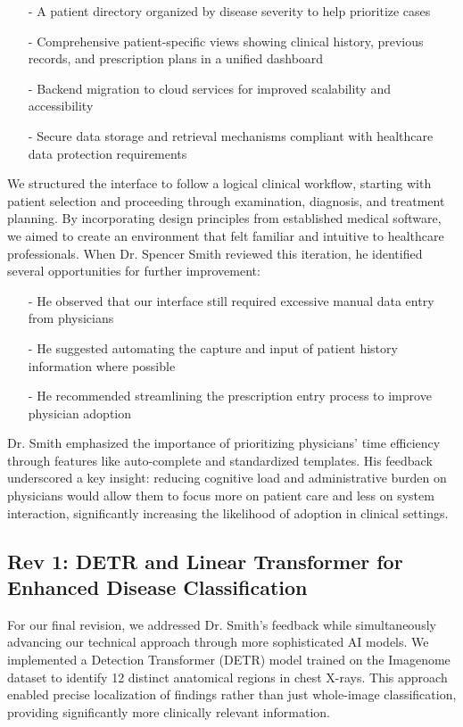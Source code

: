 \documentclass{article}
\begin{document}
\begin{itemize}
    \item[-] A patient directory organized by disease severity to help prioritize cases
    \item[-] Comprehensive patient-specific views showing clinical history, previous records, and prescription plans in a unified dashboard
    \item[-] Backend migration to cloud services for improved scalability and accessibility
    \item[-] Secure data storage and retrieval mechanisms compliant with healthcare data protection requirements
\end{itemize}

\noindent We structured the interface to follow a logical clinical workflow, starting with patient selection and proceeding through examination, diagnosis, and treatment planning. By incorporating design principles from established medical software, we aimed to create an environment that felt familiar and intuitive to healthcare professionals.
\noindent When Dr. Spencer Smith reviewed this iteration, he identified several opportunities for further improvement:

\begin{itemize}
    \item[-] He observed that our interface still required excessive manual data entry from physicians
    \item[-] He suggested automating the capture and input of patient history information where possible
    \item[-] He recommended streamlining the prescription entry process to improve physician adoption
\end{itemize}

\noindent Dr. Smith emphasized the importance of prioritizing physicians' time efficiency through features like auto-complete and standardized templates. His feedback underscored a key insight: reducing cognitive load and administrative burden on physicians would allow them to focus more on patient care and less on system interaction, significantly increasing the likelihood of adoption in clinical settings.

\subsection{Rev 1: DETR and Linear Transformer for Enhanced Disease Classification}

For our final revision, we addressed Dr. Smith's feedback while simultaneously advancing our technical approach through more sophisticated AI models. We implemented a Detection Transformer (DETR) model trained on the Imagenome dataset to identify 12 distinct anatomical regions in chest X-rays. This approach enabled precise localization of findings rather than just whole-image classification, providing significantly more clinically relevant information.
\end{document}
